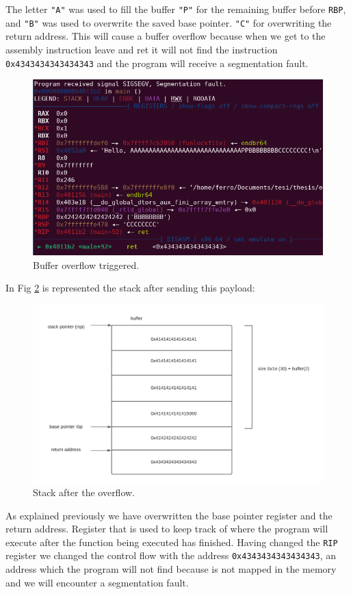     The letter \texttt{"A"} was used to fill the buffer \texttt{"P"} for the remaining buffer before \texttt{RBP}, and \texttt{"B"} was used to overwrite the saved base pointer.\newline
    \texttt{"C"} for overwriting the return address.\newline
    This will cause a buffer overflow because when we get to the assembly instruction leave and ret it will not find the instruction \texttt{0x4343434343434343} and the program will receive a segmentation fault.
    \begin{figure}[h]
        \centering
        \includegraphics[width=0.7\linewidth]{Images/example1.png}
        \caption{Buffer overflow triggered.}
        \label{fig:bofongdb}
    \end{figure}
    \newpage
    
    In Fig \ref{fig:stack w overflow}  is represented the stack after sending this payload:
    \begin{figure}[htbp]
        \centering
        \includegraphics[width=0.8\linewidth]{Images/stack_after_overflow.png}
        \caption{Stack after the overflow.}
        \label{fig:stack w overflow}
    \end{figure}
    As explained previously we have overwritten the base pointer register and the return address.\newline
    Register that is used to keep track of where the program will execute after the function being executed has finished.\newline
    Having changed the \texttt{RIP} register we changed the control flow with the address \texttt{0x4343434343434343}, an address which the program will not find because is not mapped in the memory and we will encounter a segmentation fault.\newline

